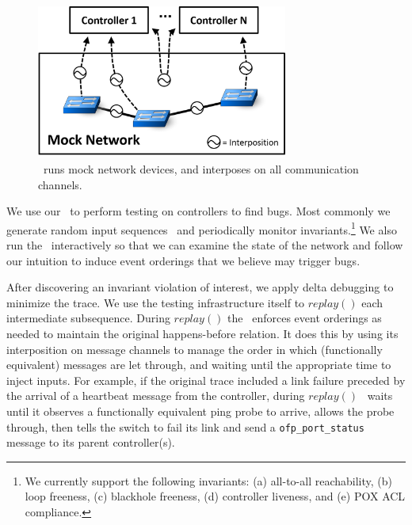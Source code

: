\begin{figure}[tb]
    \centering
    \includegraphics[width=3.25in]{../diagrams/architecture/Debugger_Architecture.png}
    \caption[]{\label{fig:architecture} \projectname~runs mock
    network devices, and interposes on all communication
    channels.}
    \vspace{-1em}
\end{figure}

We use our \tester~to perform testing on controllers to find
bugs. Most commonly we generate random input
sequences~\cite{Miller:1990:ESR:96267.96279} and periodically monitor invariants.\footnote{We currently support the following invariants:
  (a) all-to-all reachability, (b) loop freeness, (c) blackhole freeness, (d) controller
liveness, and (e) POX ACL compliance.
}
We also run the \tester~interactively
so that we can examine the state of the network
and follow our intuition to induce event orderings that we believe may trigger bugs.

 After discovering an invariant
violation of interest, we apply delta debugging to minimize the trace. We use the
testing infrastructure itself to $replay()$ each intermediate subsequence.
During $replay()$ the \tester~enforces event orderings as needed to maintain the original happens-before
relation. It does this by using its interposition on message channels to
manage the order in which (functionally equivalent) messages are let through,
and waiting until the appropriate time to inject inputs. For example, if the
original trace included a link failure preceded by the arrival of a heartbeat
message from the controller, during $replay()$ \tester~waits until it observes
a functionally equivalent ping probe to arrive, allows the probe
through, then tells the switch to fail its link and send a \verb=ofp_port_status=
message to its parent controller(s).

